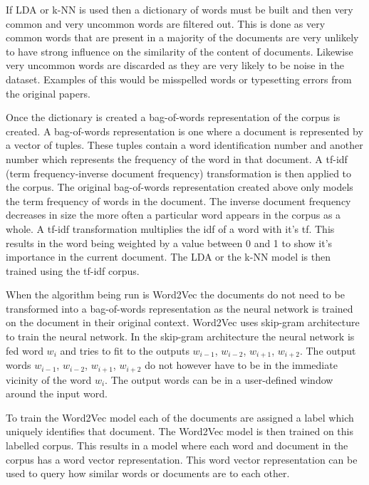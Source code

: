 If LDA or k-NN is used then a dictionary of words must be built and then very common and very uncommon words are filtered out.
This is done as very common words that are present in a majority of the documents are very unlikely to have strong influence on the similarity of the content of documents.
Likewise very uncommon words are discarded as they are very likely to be noise in the dataset.
Examples of this would be misspelled words or typesetting errors from the original papers.

Once the dictionary is created a bag-of-words representation of the corpus is created.
A bag-of-words representation is one where a document is represented by a vector of tuples.
These tuples contain a word identification number and another number which represents the frequency of the word in that document.
A tf-idf (term frequency-inverse document frequency) transformation is then applied to the corpus.
The original bag-of-words representation created above only models the term frequency of words in the document.
The inverse document frequency decreases in size the more often a particular word appears in the corpus as a whole.
A tf-idf transformation multiplies the idf of a word with it's tf.
This results in the word being weighted by a value between 0 and 1 to show it's importance in the current document.
The LDA or the k-NN model is then trained using the tf-idf corpus.

When the algorithm being run is Word2Vec the documents do not need to be transformed into a bag-of-words representation as the neural network is trained on the document in their original context.
Word2Vec uses skip-gram architecture to train the neural network.
In the skip-gram architecture the neural network is fed word \(w_{i}\) and tries to fit to the outputs \(w_{i-1}\), \(w_{i-2}\), \(w_{i+1}\), \(w_{i+2}\).
The output words \(w_{i-1}\), \(w_{i-2}\), \(w_{i+1}\), \(w_{i+2}\) do not however have to be in the immediate vicinity of the word \(w_{i}\).
The output words can be in a user-defined window around the input word.

To train the Word2Vec model each of the documents are assigned a label which uniquely identifies that document.
The Word2Vec model is then trained on this labelled corpus.
This results in a model where each word and document in the corpus has a word vector representation.
This word vector representation can be used to query how similar words or documents are to each other.


